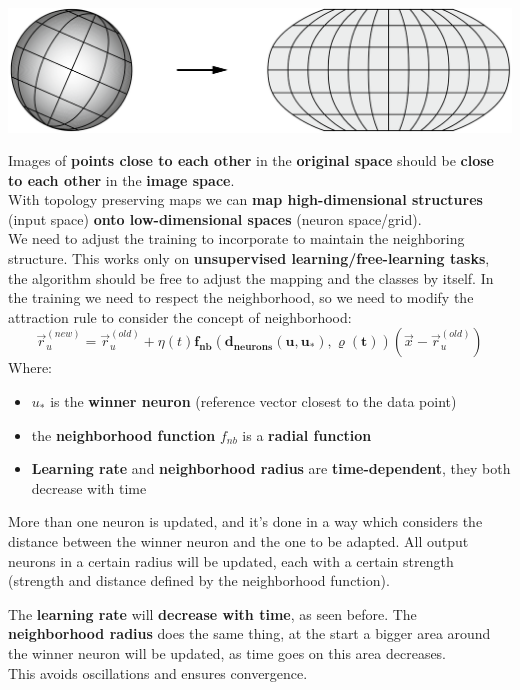 \documentclass[11pt]{article}
\begin{document}
		\begin{center}
			\includegraphics[width=0.9\columnwidth]{img/NN/topology1}
		\end{center}
		
		Images of \textbf{points close to each other} in the \textbf{original space} should be \textbf{close to each other} in the \textbf{image space}.\\
		
		With topology preserving maps we can \textbf{map high-dimensional structures} (input space) \textbf{onto low-dimensional spaces} (neuron space/grid).\\
		
		We need to adjust the training to incorporate to maintain the neighboring structure. This works only on \textbf{unsupervised learning/free-learning tasks}, the algorithm should be free to adjust the mapping and the classes by itself. In the training we need to respect the neighborhood, so we need to modify the attraction rule to consider the concept of neighborhood:
		$$ \vec{r}_u^{(new)} = \vec{r}_u^{(old)} + \eta(t) \bm{f_{nb} \left(d_{neurons} (u, u_{\ast}), \varrho (t)\right)} (\vec{x} - \vec{r}_u^{(old)}) $$
		Where: 
		\begin{itemize}
			\item $u_\ast$ is the \textbf{winner neuron} (reference vector closest to the data point)
			\item the \textbf{neighborhood function} $f_{nb}$ is a \textbf{radial function}
			\item \textbf{Learning rate} and \textbf{neighborhood radius} are \textbf{time-dependent}, they both decrease with time
		\end{itemize}
		More than one neuron is updated, and it's done in a way which considers the distance between the winner neuron and the one to be adapted. All output neurons in a certain radius will be updated, each with a certain strength (strength and distance defined by the neighborhood function).\\
		
		\newpage
		
		The \textbf{learning rate} will \textbf{decrease with time}, as seen before. The \textbf{neighborhood radius} does the same thing, at the start a bigger area around the winner neuron will be updated, as time goes on this area decreases.\\
		This avoids oscillations and ensures convergence.\\
		
\end{document}
